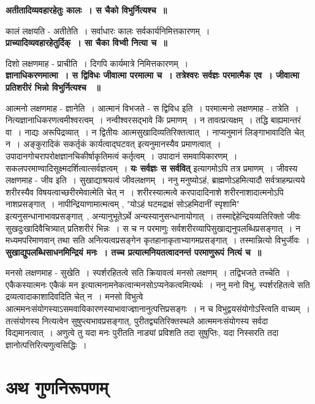 	{\bfseries अतीतादिव्यवहारहेतुः कालः~। स चैको विभुर्नित्यश्च~॥}\par
		कालं लक्षयति - अतीतेति~। सर्वाधारः कालः सर्वकार्यनिमित्तकारणम्~।\\[10pt]
	\noindent
	{\bfseries प्राच्यादिव्यवहारहेतुर्दिक्~। सा चैका विभ्वी नित्या च~॥}\par
		दिशो लक्षणमाह - प्राचीति~। दिगपि कार्यमात्रे निमित्तकारणम्~।\\[10pt]
	{\bfseries ज्ञानाधिकरणमात्मा~। स द्विविधः जीवात्मा परमात्मा च~। तत्रेश्वरः सर्वज्ञः परमात्मैक एव~। जीवात्मा प्रतिशरीरं भिन्नो विभुर्नित्यश्च ~॥}\par
		आत्मनो लक्षणमाह - ज्ञानेति~। आत्मानं विभजते - स द्विविध इति~। परमात्मनो लक्षणमाह - तत्रेति~। नित्यज्ञानाधिकरणत्वमीश्वरत्वम्~। नन्वीश्वरसद्भावे किं प्रमाणम्~। न तावत्प्रत्यक्षम्~। तद्धि बाह्यमान्तरं वा~। नाद्यः अरूपिद्रव्यात्~। न द्वितीयः आत्मसुखादिव्यतिरिक्तत्वात्~। नाप्यनुमानं लिङ्गाभावादिति चेत् न~। अङ्कुरादिकं सकर्तृकं कार्यत्वाद्घटवत् इत्यनुमानस्यैव प्रमाणत्वात्~। उपादानगोचरापरोक्षज्ञानचिकीर्षाकृतिमत्वं कर्तृत्वम्~। उपादानं समवायिकारणम्~। सकलपरमाण्वादिसूक्ष्मदर्शित्वात्सर्वज्ञत्वम्~। {\bfseries यः सर्वज्ञः स सर्ववित्} इत्यागमोऽपि तत्र प्रमाणम्~। जीवस्य लक्षणमाह - जीव इति~। सुखाद्याश्रयत्वं जीवलक्षणम्~। ननु मनुष्योऽहं, ब्राह्मणोऽहमित्यादौ सर्वत्राहम्प्रत्यये शरीरस्यैव विषयत्वाच्छरीरमेवात्मेति चेत् न~। शरीरस्यात्मत्वे करपादादिनाशे शरीरनाशादात्मनोऽपि नाशप्रसङ्गात्~। नापीन्द्रियाणामात्मत्वम् , "योऽहं घटमद्राक्षं सोऽहमिदानीं स्पृशामि" इत्यनुसन्धानाभावप्रसङ्गात्~, अन्यानुभूतेऽर्थे अन्यस्यानुसन्धानायोगात्~। तस्माद्देहेन्द्रियव्यतिरिक्तो जीवः सुखदुःखादिवैचित्र्यात् प्रतिशरीरं भिन्नः~। स च न परमाणुः सर्वशरीरव्यापिसुखाद्यनुपलब्धिप्रसङ्गात्~। न मध्यमपरिमाणवान् तथा सति अनित्यत्वप्रसङ्गेन कृतहानाकृताभ्यागमप्रसङ्गात्~। तस्मान्नित्यो विभुर्जीवः~।\\[10pt]
	{\bfseries सुखाद्युपलब्धिसाधनमिन्द्रियं मनः~। तच्च प्रत्यात्मनियतत्वादनन्तं परमाणुरूपं नित्यं च~॥}\par
		मनसो लक्षणमाह - सुखेति~। स्पर्शरहितत्वे सति क्रियावत्वं मनसो लक्षणम्~। तद्विभजते तच्चेति~। एकैकस्यात्मनः एकैकं मन इत्यात्मनामनेकत्वान्मनसोऽप्यनेकत्वमित्यर्थः~। ननु मनो विभु, स्पर्शरहितत्वे सति द्रव्यत्वादाकाशादिवदिति चेत् न~। मनसो विभुत्वे आत्ममनःसंयोगस्याऽसमवायिकारणस्याभावाज्ज्ञानानुत्पत्तिप्रसङ्गः~। न च विभुद्वयसंयोगोऽस्त्विति वाच्यम्~। तत्संयोगस्य नित्यत्वेन सुषुप्त्यभावप्रसङ्गात्, पुरीतद्व्यतिरिक्तस्थले आत्ममनःसंयोगस्य सर्वदा विद्यमानत्वात्~। अणुत्वे तु यदा मनः पुरीतति नाड्यां प्रविशति तदा सुषुप्तिः, यदा निस्सरति तदा ज्ञानोत्पत्तिरित्यणुत्वसिद्धिः~। \section*{अथ गुणनिरूपणम्}
